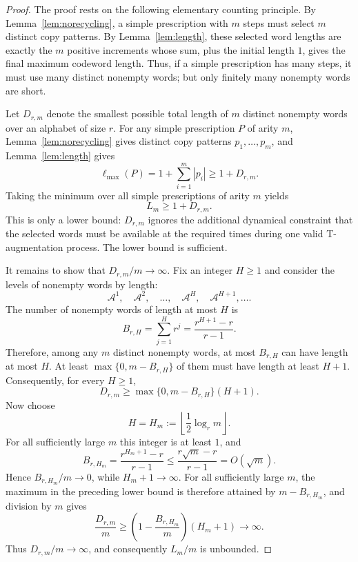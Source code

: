 \documentclass[11pt]{article}
\newcommand{\A}{\mathcal A}
\newcommand{\ellmax}{\ell_{\max}}
\begin{document}
\begin{proof}
The proof rests on the following elementary counting principle. By Lemma~\ref{lem:norecycling}, a simple prescription with $m$ steps must select $m$ distinct copy patterns. By Lemma~\ref{lem:length}, these selected word lengths are exactly the $m$ positive increments whose sum, plus the initial length $1$, gives the final maximum codeword length. Thus, if a simple prescription has many steps, it must use many distinct nonempty words; but only finitely many nonempty words are short.

Let $D_{r,m}$ denote the smallest possible total length of $m$ distinct nonempty words over an alphabet of size $r$. For any simple prescription $P$ of arity $m$, Lemma~\ref{lem:norecycling} gives distinct copy patterns $p_1,\ldots,p_m$, and Lemma~\ref{lem:length} gives
\begin{equation}
\ellmax(P)=1+\sum_{i=1}^{m}|p_i|\geq 1+D_{r,m}.
\end{equation}
Taking the minimum over all simple prescriptions of arity $m$ yields
\begin{equation}
L_m\geq 1+D_{r,m}.
\end{equation}
This is only a lower bound: $D_{r,m}$ ignores the additional dynamical constraint that the selected words must be available at the required times during one valid T-augmentation process. The lower bound is sufficient.

It remains to show that $D_{r,m}/m\to\infty$. Fix an integer $H\geq 1$ and consider the levels of nonempty words by length:
\begin{equation}
\A^1,\quad \A^2,\quad \ldots,\quad \A^H,\quad \A^{H+1},\ldots .
\end{equation}
The number of nonempty words of length at most $H$ is
\begin{equation}
B_{r,H}=\sum_{j=1}^{H}r^j=\frac{r^{H+1}-r}{r-1}.
\end{equation}
Therefore, among any $m$ distinct nonempty words, at most $B_{r,H}$ can have length at most $H$. At least $\max\{0,m-B_{r,H}\}$ of them must have length at least $H+1$. Consequently, for every $H\geq 1$,
\begin{equation}
D_{r,m}\geq \max\{0,m-B_{r,H}\}(H+1).
\end{equation}
Now choose
\begin{equation}
H=H_m:=\left\lfloor \frac{1}{2}\log_r m\right\rfloor .
\end{equation}
For all sufficiently large $m$ this integer is at least $1$, and
\begin{equation}
B_{r,H_m}=\frac{r^{H_m+1}-r}{r-1}\leq \frac{r\sqrt m-r}{r-1}=O(\sqrt m).
\end{equation}
Hence $B_{r,H_m}/m\to 0$, while $H_m+1\to\infty$. For all sufficiently large $m$, the maximum in the preceding lower bound is therefore attained by $m-B_{r,H_m}$, and division by $m$ gives
\begin{equation}
\frac{D_{r,m}}{m}
\geq \left(1-\frac{B_{r,H_m}}{m}\right)(H_m+1)
\longrightarrow \infty.
\end{equation}
Thus $D_{r,m}/m\to\infty$, and consequently $L_m/m$ is unbounded.


\end{proof}
\end{document}

